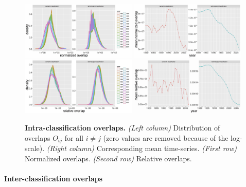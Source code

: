\documentclass[12pt,twoside,a4paper]{article}
\begin{document}
\begin{figure}[!ht]
\centering
\includegraphics[width=0.49\textwidth]{norm-patents_all_density_semcounts.jpg}
\includegraphics[width=0.49\textwidth]{norm-patents_all_ts_semcounts.jpg} \\
\includegraphics[width=0.49\textwidth]{relative_all_density_semcounts.jpg}
\includegraphics[width=0.49\textwidth]{relative_all_ts_semcounts.jpg}
\caption{
\textbf{Intra-classification overlaps.}
\textit{(Left column)} Distribution of overlaps $O_{ij}$ for all $i\neq j$ (zero values are removed because of the log-scale). \textit{(Right column)} Corresponding mean time-series. \textit{(First row)} Normalized overlaps. \textit{(Second row)} Relative overlaps.}
\label{fig:intra-classif-overlap}
\end{figure}


\paragraph*{Inter-classification overlaps}
\end{document}
